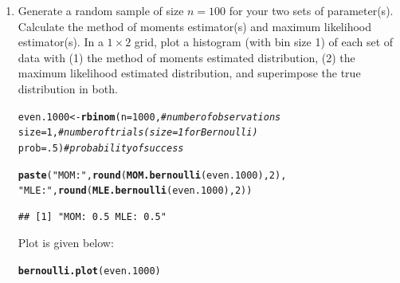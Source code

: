 \documentclass{article}\usepackage[]{graphicx}\usepackage[]{color}
\makeatletter
\newcommand{\hlnum}[1]{\textcolor[rgb]{0.686,0.059,0.569}{#1}}%
\newcommand{\hlstr}[1]{\textcolor[rgb]{0.192,0.494,0.8}{#1}}%
\newcommand{\hlcom}[1]{\textcolor[rgb]{0.678,0.584,0.686}{\textit{#1}}}%
\newcommand{\hlstd}[1]{\textcolor[rgb]{0.345,0.345,0.345}{#1}}%
\newcommand{\hlkwb}[1]{\textcolor[rgb]{0.69,0.353,0.396}{#1}}%
\newcommand{\hlkwc}[1]{\textcolor[rgb]{0.333,0.667,0.333}{#1}}%
\newcommand{\hlkwd}[1]{\textcolor[rgb]{0.737,0.353,0.396}{\textbf{#1}}}%
\newenvironment{kframe}{%
 \def\at@end@of@kframe{}%
 \ifinner\ifhmode%
  \def\at@end@of@kframe{\end{minipage}}%
  \begin{minipage}{\columnwidth}%
 \fi\fi%
 \def\FrameCommand##1{\hskip\@totalleftmargin \hskip-\fboxsep
 \colorbox{shadecolor}{##1}\hskip-\fboxsep
     \hskip-\linewidth \hskip-\@totalleftmargin \hskip\columnwidth}%
 \MakeFramed {\advance\hsize-\width
   \@totalleftmargin\z@ \linewidth\hsize
   \@setminipage}}%
 {\par\unskip\endMakeFramed%
 \at@end@of@kframe}
\newenvironment{knitrout}{}{} %
\makeatother
\begin{document}
\begin{enumerate}
\begin{enumerate}
  \item Generate a random sample of size $n=100$ for your two sets of parameter(s).
  Calculate the method of moments estimator(s) and maximum likelihood estimator(s).
  In a $1 \times 2$ grid, plot a histogram (with bin size 1) of each set of data 
  with (1) the method of moments estimated distribution, (2) the maximum likelihood
  estimated distribution, and superimpose the true distribution in both.
\begin{knitrout}
\color{fgcolor}\begin{kframe}
\begin{alltt}
\hlstd{even.1000} \hlkwb{<-} \hlkwd{rbinom}\hlstd{(}\hlkwc{n}\hlstd{=}\hlnum{1000}\hlstd{,}        \hlcom{#number of observations}
                  \hlkwc{size}\hlstd{=}\hlnum{1}\hlstd{,}        \hlcom{#number of trials (size=1 for Bernoulli)}
                  \hlkwc{prob}\hlstd{=}\hlnum{.5}\hlstd{)}       \hlcom{#probability of success}

\hlkwd{paste}\hlstd{(}\hlstr{"MOM:"}\hlstd{,} \hlkwd{round}\hlstd{(}\hlkwd{MOM.bernoulli}\hlstd{(even.1000),}\hlnum{2}\hlstd{),}
      \hlstr{"MLE:"}\hlstd{,} \hlkwd{round}\hlstd{(}\hlkwd{MLE.bernoulli}\hlstd{(even.1000),} \hlnum{2}\hlstd{))}
\end{alltt}
\begin{verbatim}
## [1] "MOM: 0.5 MLE: 0.5"
\end{verbatim}
\end{kframe}
\end{knitrout}
Plot is given below:
\begin{knitrout}
\color{fgcolor}\begin{kframe}
\begin{alltt}
\hlkwd{bernoulli.plot}\hlstd{(even.1000)}
\end{alltt}
\end{kframe}
\end{knitrout}


\end{enumerate}
\end{enumerate}
\end{document}
